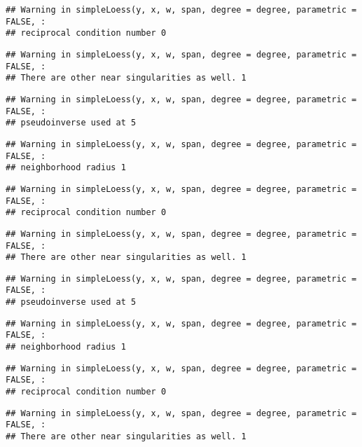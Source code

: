 \documentclass[
]{article}
\begin{document}
\begin{verbatim}
## Warning in simpleLoess(y, x, w, span, degree = degree, parametric = FALSE, :
## reciprocal condition number 0
\end{verbatim}

\begin{verbatim}
## Warning in simpleLoess(y, x, w, span, degree = degree, parametric = FALSE, :
## There are other near singularities as well. 1
\end{verbatim}

\begin{verbatim}
## Warning in simpleLoess(y, x, w, span, degree = degree, parametric = FALSE, :
## pseudoinverse used at 5
\end{verbatim}

\begin{verbatim}
## Warning in simpleLoess(y, x, w, span, degree = degree, parametric = FALSE, :
## neighborhood radius 1
\end{verbatim}

\begin{verbatim}
## Warning in simpleLoess(y, x, w, span, degree = degree, parametric = FALSE, :
## reciprocal condition number 0
\end{verbatim}

\begin{verbatim}
## Warning in simpleLoess(y, x, w, span, degree = degree, parametric = FALSE, :
## There are other near singularities as well. 1
\end{verbatim}

\begin{verbatim}
## Warning in simpleLoess(y, x, w, span, degree = degree, parametric = FALSE, :
## pseudoinverse used at 5
\end{verbatim}

\begin{verbatim}
## Warning in simpleLoess(y, x, w, span, degree = degree, parametric = FALSE, :
## neighborhood radius 1
\end{verbatim}

\begin{verbatim}
## Warning in simpleLoess(y, x, w, span, degree = degree, parametric = FALSE, :
## reciprocal condition number 0
\end{verbatim}

\begin{verbatim}
## Warning in simpleLoess(y, x, w, span, degree = degree, parametric = FALSE, :
## There are other near singularities as well. 1
\end{verbatim}
\end{document}
